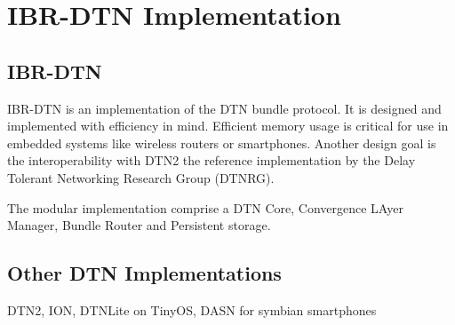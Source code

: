 \chapter{IBR-DTN Implementation}
\section{IBR-DTN}

IBR-DTN is an implementation of the DTN bundle protocol. It is designed and
implemented with efficiency in mind. Efficient memory usage is critical for
use in embedded systems like wireless routers or smartphones. Another design
goal is the interoperability with DTN2 the reference implementation by the Delay
Tolerant Networking Research Group (DTNRG).

The modular implementation comprise a DTN Core, Convergence LAyer Manager,
Bundle Router and Persistent storage.

\section{Other DTN Implementations}

DTN2, ION, DTNLite on TinyOS, DASN for symbian smartphones

